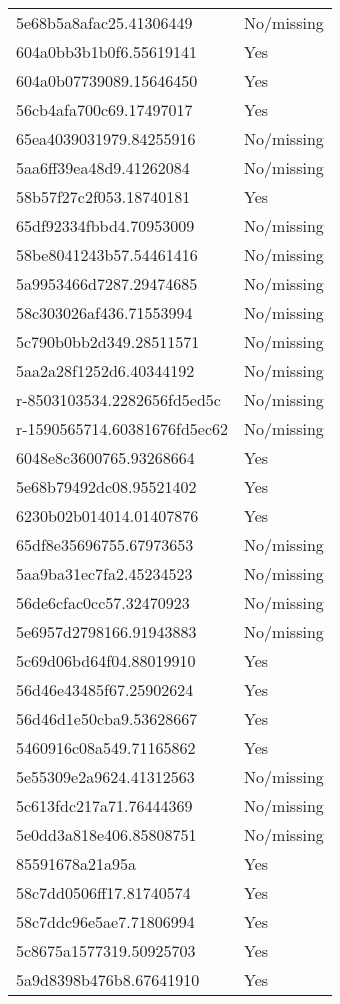 \begin{tabular}{ll}
5e68b5a8afac25.41306449 & No/missing \\
604a0bb3b1b0f6.55619141 & Yes \\
604a0b07739089.15646450 & Yes \\
56cb4afa700c69.17497017 & Yes \\
65ea4039031979.84255916 & No/missing \\
5aa6ff39ea48d9.41262084 & No/missing \\
58b57f27c2f053.18740181 & Yes \\
65df92334fbbd4.70953009 & No/missing \\
58be8041243b57.54461416 & No/missing \\
5a9953466d7287.29474685 & No/missing \\
58c303026af436.71553994 & No/missing \\
5c790b0bb2d349.28511571 & No/missing \\
5aa2a28f1252d6.40344192 & No/missing \\
r-8503103534.2282656fd5ed5c & No/missing \\
r-1590565714.60381676fd5ec62 & No/missing \\
6048e8c3600765.93268664 & Yes \\
5e68b79492dc08.95521402 & Yes \\
6230b02b014014.01407876 & Yes \\
65df8e35696755.67973653 & No/missing \\
5aa9ba31ec7fa2.45234523 & No/missing \\
56de6cfac0cc57.32470923 & No/missing \\
5e6957d2798166.91943883 & No/missing \\
5c69d06bd64f04.88019910 & Yes \\
56d46e43485f67.25902624 & Yes \\
56d46d1e50cba9.53628667 & Yes \\
5460916c08a549.71165862 & Yes \\
5e55309e2a9624.41312563 & No/missing \\
5c613fdc217a71.76444369 & No/missing \\
5e0dd3a818e406.85808751 & No/missing \\
85591678a21a95a & Yes \\
58c7dd0506ff17.81740574 & Yes \\
58c7ddc96e5ae7.71806994 & Yes \\
5c8675a1577319.50925703 & Yes \\
5a9d8398b476b8.67641910 & Yes \\

\end{tabular}

